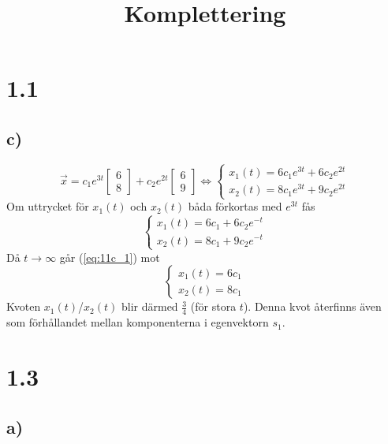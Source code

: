 \documentclass[a4paper]{article}
\title{Komplettering}
\begin{document}
\maketitle

\section*{1.1}
\subsection*{c)}

\begin{equation*}
  \vec{x} = c_1e^{3t}\begin{bmatrix}6\\8\end{bmatrix} + c_2e^{2t}\begin{bmatrix}6\\9\end{bmatrix}
  \iff \begin{cases}
    x_1(t) = 6c_1e^{3t} + 6c_2e^{2t}\\
    x_2(t) = 8c_1e^{3t} + 9c_2e^{2t}
    \end{cases}
\end{equation*}
Om uttrycket för $x_1(t)$ och $x_2(t)$ båda förkortas med $e^{3t}$ fås
\begin{equation}
  \begin{cases}
    x_1(t) = 6c_1 + 6c_2e^{-t}\\
    x_2(t) = 8c_1 + 9c_2e^{-t}
\end{cases}\label{eq:11c_1}
\end{equation}
Då $t\to\infty$ går (\ref{eq:11c_1}) mot
\begin{equation*}
  \begin{cases}
    x_1(t) = 6c_1\\
    x_2(t) = 8c_1
\end{cases}
\end{equation*}
Kvoten $x_1(t)$/$x_2(t)$ blir därmed $\frac 34$ (för stora $t$). Denna kvot återfinns även som förhållandet mellan komponenterna i egenvektorn $s_1$.

\section*{1.3}
\subsection*{a)}
\end{document}
